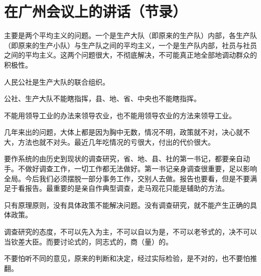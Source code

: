\section[在广州会议上的讲话（节录）（一九六一年三月）]{在广州会议上的讲话（节录）}

主要是两个平均主义的问题。一个是生产大队（即原来的生产队）内部，各生产队（即原来的生产小队）与生产队之间的平均主义，一个是生产队内部，社员与社员之间的平均主义。这两个问题很大，不彻底解决，不可能真正地全部地调动群众的积极性。

人民公社是生产大队的联合组织。

公社、生产大队不能瞎指挥，县、地、省、中央也不能瞎指挥。

不能用领导工业的办法来领导农业，也不能用领导农业的方法来领导工业。


几年来出的问题，大体上都是因为胸中无数，情况不明，政策就不对，决心就不大，方法也就不对头。最近几年吃情况的亏很大，付出的代价很大。

要作系统的由历史到现状的调查研究，省、地、县、社的第一书记，都要亲自动手。不做好调查工作，一切工作都无法做好。第一书记亲身调查很重要，足以影响全局。今后我们必须摆脱一部分事务工作，交别人去做。报告也要看，但是不要满足于看报告。最重要的是亲自作典型调查，走马观花只能是辅助的方法。

只有原理原则，没有具体政策不能解决问题。没有调查研究，就不能产生正确的具体政策。

调查研究的态度，不可以先入为主，不可以自以为是，不可以老爷式的，决不可以当钦差大臣。而要讨论式的，同志式的，商（量）的。

不要怕听不同的意见，原来的判断和决定，经过实际检验，是不对的，也不要怕推翻。


